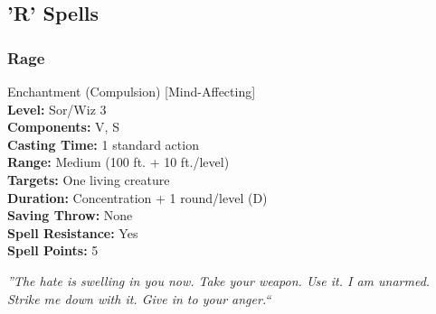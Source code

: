 \subsection{'R' Spells}
\subsubsection{Rage}
\label{Spell:Rage}
Enchantment (Compulsion) [Mind-Affecting]
\\ \textbf{Level:} Sor/Wiz 3
\\ \textbf{Components:} V, S
\\ \textbf{Casting Time:} 1 standard action
\\ \textbf{Range:} Medium (100 ft. + 10 ft./level)
\\ \textbf{Targets:} One living creature
\\ \textbf{Duration:} Concentration + 1 round/level (D)
\\ \textbf{Saving Throw:} None
\\ \textbf{Spell Resistance:} Yes
\\ \textbf{Spell Points:} 5

\emph{''The hate is swelling in you now. Take your weapon. Use it. I am unarmed. Strike me down with it. Give in to your anger.``}

